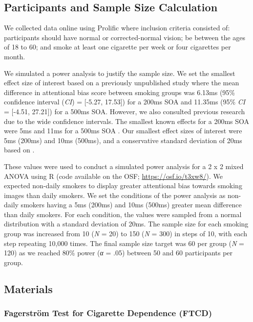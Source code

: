 \documentclass[empirical, authordate, issue]{jote-new-article}
\begin{document}
\subsection{Participants and Sample Size Calculation}

We collected data online using Prolific where inclusion criteria consisted of: participants should have normal or corrected-normal vision; be between the ages of 18 to 60; and smoke at least one cigarette per week or four cigarettes per month.

We simulated a power analysis to justify the sample size. We set the smallest effect size of interest based on a previously unpublished study \parencite{Bartlett2020} where the mean difference in attentional bias score between smoking groups was 6.13ms (95\% confidence interval (\emph{CI}) = [-5.27, 17.53]) for a 200ms SOA and 11.35ms (95\% \emph{CI} = [-4.51, 27.21]) for a 500ms SOA. However, we also consulted previous research due to the wide confidence intervals. The smallest known effects for a 200ms SOA were 5ms \parencite{Chanon2010} and 11ms for a 500ms SOA \parencite{Bradley2003}. Our smallest effect sizes of interest were 5ms (200ms) and 10ms (500ms), and a conservative standard deviation of 20ms based on \textcite{Vollstädt-Klein2011}.

These values were used to conduct a simulated power analysis for a 2 x 2 mixed ANOVA using R (code available on the OSF; \url{https://osf.io/t3xw8/}). We expected non-daily smokers to display greater attentional bias towards smoking images than daily smokers. We set the conditions of the power analysis as non-daily smokers having a 5ms (200ms) and 10ms (500ms) greater mean difference than daily smokers. For each condition, the values were sampled from a normal distribution with a standard deviation of 20ms. The sample size for each smoking group was increased from 10 (\emph{N} = 20) to 150 (\emph{N} = 300) in steps of 10, with each step repeating 10,000 times. The final sample size target was 60 per group (\emph{N} = 120) as we reached 80\% power (\emph{α} = .05) between 50 and 60 participants per group.

\subsection{Materials}

\subsubsection{Fagerström Test for Cigarette Dependence (FTCD)}
\end{document}
